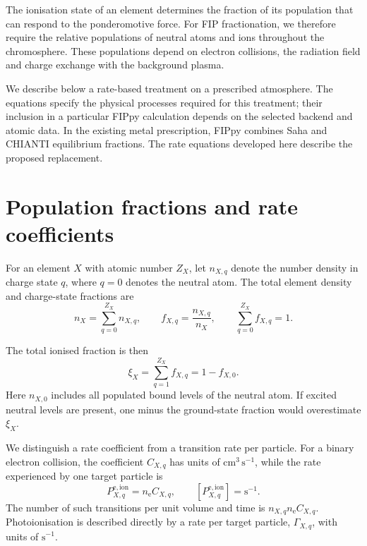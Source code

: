 \documentclass[a4paper,10pt,twoside,openany]{book}
\newcommand{\ChapColor}{Cap1Blue}
\newcommand{\ChapColorLight}{LightBlue}
\newenvironment{definition}[1]{%
  \begin{tcolorbox}[notebox,
    colback=\ChapColorLight,colframe=\ChapColor,
    colbacktitle=\ChapColor,coltitle=white,
    title={Definition: #1}]}{\end{tcolorbox}}
\newenvironment{lesson}[1]{%
  \begin{tcolorbox}[notebox,colback=white,colframe=\ChapColor,
    colbacktitle=\ChapColor,coltitle=white,
    title={#1}]}{\end{tcolorbox}}
\begin{document}
The ionisation state of an element determines the fraction of its population
that can respond to the ponderomotive force. For FIP fractionation, we therefore
require the relative populations of neutral atoms and ions throughout the
chromosphere. These populations depend on electron collisions, the radiation
field and charge exchange with the background plasma.

We describe below a rate-based treatment on a prescribed atmosphere. The
equations specify the physical processes required for this treatment; their
inclusion in a particular FIPpy calculation depends on the selected backend
and atomic data. In the existing metal prescription, FIPpy combines Saha and
CHIANTI equilibrium fractions. The rate equations developed here describe the
proposed replacement.

\section{Population fractions and rate coefficients}
\label{subsec:population_definitions}

For an element \(X\) with atomic number \(Z_X\), let \(n_{X,q}\) denote the
number density in charge state \(q\), where \(q=0\) denotes the neutral atom.
The total element density and charge-state fractions are
\begin{equation}
 n_X=\sum_{q=0}^{Z_X}n_{X,q},
 \qquad
 f_{X,q}=\frac{n_{X,q}}{n_X},
 \qquad
 \sum_{q=0}^{Z_X}f_{X,q}=1.
 \label{eq:ion_population_definitions}
\end{equation}
\begin{definition}{Total ionised fraction}
The total ionised fraction is then
\begin{equation}
 \xi_X=\sum_{q=1}^{Z_X}f_{X,q}=1-f_{X,0}.
 \label{eq:ion_total_fraction}
\end{equation}
Here \(n_{X,0}\) includes all populated bound levels of the neutral atom.
If excited neutral levels are present, one minus the ground-state fraction
would overestimate \(\xi_X\).
\end{definition}

\begin{lesson}{Rate coefficients and transition rates}
We distinguish a rate coefficient from a transition rate per particle.
For a binary electron collision, the coefficient \(C_{X,q}\) has units of
\(\mathrm{cm^3\,s^{-1}}\), while the rate experienced by one target particle is
\begin{equation}
 P_{X,q}^{\mathrm{e,ion}}=n_{\mathrm e}C_{X,q},
 \qquad
 [P_{X,q}^{\mathrm{e,ion}}]=\mathrm{s^{-1}}.
 \label{eq:ion_coefficient_rate}
\end{equation}
The number of such transitions per unit volume and time is
\(n_{X,q}n_{\mathrm e}C_{X,q}\).
Photoionisation is described directly by a rate per target particle,
\(\Gamma_{X,q}\), with units of \(\mathrm{s^{-1}}\).
\end{lesson}
\end{document}
